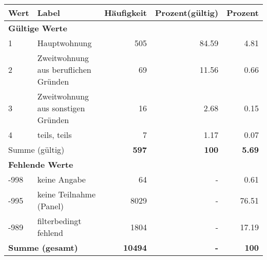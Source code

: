     \begin{longtable}{lXrrr}
     \toprule
     \textbf{Wert} & \textbf{Label} & \textbf{Häufigkeit} & \textbf{Prozent(gültig)} & \textbf{Prozent} \\
     \endhead
     \midrule
     \multicolumn{5}{l}{\textbf{Gültige Werte}}\\

     1 &
     \multicolumn{1}{X}{ Hauptwohnung   } &


       \num{505} &
       \num[round-mode=places,round-precision=2]{84,59} &
         \num[round-mode=places,round-precision=2]{4,81} \\

     2 &
     \multicolumn{1}{X}{ Zweitwohnung aus beruflichen Gründen   } &


       \num{69} &
       \num[round-mode=places,round-precision=2]{11,56} &
         \num[round-mode=places,round-precision=2]{0,66} \\

     3 &
     \multicolumn{1}{X}{ Zweitwohnung aus sonstigen Gründen   } &


       \num{16} &
       \num[round-mode=places,round-precision=2]{2,68} &
         \num[round-mode=places,round-precision=2]{0,15} \\

     4 &
     \multicolumn{1}{X}{ teils, teils   } &


       \num{7} &
       \num[round-mode=places,round-precision=2]{1,17} &
         \num[round-mode=places,round-precision=2]{0,07} \\
     \midrule
     \multicolumn{2}{l}{Summe (gültig)} &
       \textbf{\num{597}} &
     \textbf{100} &
       \textbf{\num[round-mode=places,round-precision=2]{5,69}} \\
     \multicolumn{5}{l}{\textbf{Fehlende Werte}}\\
       -998 &
       keine Angabe &
         \num{64} &
        - &
         \num[round-mode=places,round-precision=2]{0,61} \\
       -995 &
       keine Teilnahme (Panel) &
         \num{8029} &
        - &
         \num[round-mode=places,round-precision=2]{76,51} \\
       -989 &
       filterbedingt fehlend &
         \num{1804} &
        - &
         \num[round-mode=places,round-precision=2]{17,19} \\
     \midrule
     \multicolumn{2}{l}{\textbf{Summe (gesamt)}} &
          \textbf{\num{10494}} &
        \textbf{-} &
        \textbf{100} \\
     \bottomrule
     \end{longtable}
     
